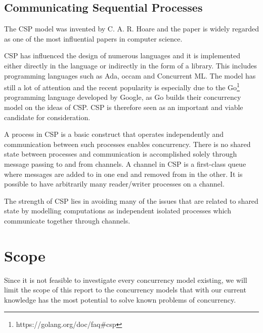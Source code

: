 \subsection{Communicating Sequential Processes}
The \ac{CSP} model was invented by C. A. R. Hoare\cite{hoare1978communicating} and the paper is widely regarded as one of the most influential papers in computer science\cite{abdallah2005communicating}. 

\ac{CSP} has influenced the design of numerous languages and it is implemented either directly in the language or indirectly in the form of a library. This includes programming languages such as Ada, occam and Concurrent ML\cite{abdallah2005communicating}. The model has still a lot of attention and the recent popularity is especially due to the Go\footnote{https://golang.org/doc/faq\#csp} programming language developed by Google, as Go builds their concurrency model on the ideas of \ac{CSP}\cite[Chap. 6]{sevenModels}. \ac{CSP} is therefore seen as an important and viable candidate for consideration.

A process in \ac{CSP} is a basic construct that operates independently and communication between such processes enables concurrency\cite{ibmCSP}. There is no shared state between processes and communication is accomplished solely through message passing to and from channels. A channel in \ac{CSP} is a first-class queue where messages are added to in one end and removed from in the other\cite[Chap. 6]{sevenModels}. It is possible to have arbitrarily many reader/writer processes on a channel. 

The strength of \ac{CSP} lies in avoiding many of the issues that are related to shared state by modelling computations as independent isolated processes which communicate together through channels. 

\section{Scope}
Since it is not feasible to investigate every concurrency model existing, we will limit the scope of this report to the concurrency models that with our current knowledge has the most potential to solve known problems of concurrency.

